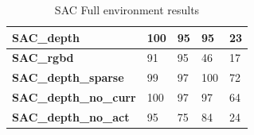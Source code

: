 \begin{table}[!htbp]
\begin{tabular}{l|l|l|l|l|}
    \multicolumn{1}{|l|}{\textbf{SAC\_depth}}           & 100                                                                                         & 95                                                                                         & 95                                                                                          & 23                                                                                         \\ \hline
    \multicolumn{1}{|l|}{\textbf{SAC\_rgbd}}            & 91                                                                                          & 95                                                                                         & 46                                                                                          & 17                                                                                         \\ \hline
    \multicolumn{1}{|l|}{\textbf{SAC\_depth\_sparse}}  & 99                                                                                          & 97                                                                                         & 100                                                                                         & 72                                                                                         \\ \hline
    \multicolumn{1}{|l|}{\textbf{SAC\_depth\_no\_curr}} & 100                                                                                         & 97                                                                                         & 97                                                                                          & 64                                                                                         \\ \hline
    \multicolumn{1}{|l|}{\textbf{SAC\_depth\_no\_act}}  & 95                                                                                          & 75                                                                                         & 84                                                                                          & 24                                                                                         \\ \hline
\end{tabular}
\caption{SAC Full environment results \label{table:SACfull}}
\end{table}


